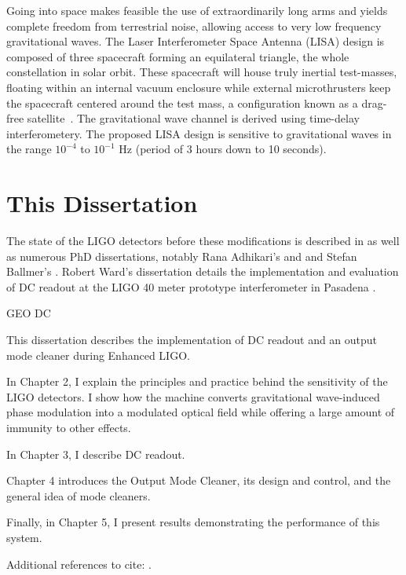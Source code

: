 Going into space makes feasible the use of extraordinarily long arms
and yields complete freedom from terrestrial noise, allowing access to
very low frequency gravitational waves.  The Laser Interferometer
Space Antenna (LISA) design is composed of three spacecraft forming an
equilateral triangle, the whole constellation in solar orbit.  These
spacecraft will house truly inertial test-masses, floating within an
internal vacuum enclosure while external microthrusters keep the
spacecraft centered around the test mass, a configuration known as a drag-free satellite~\cite{Lange1964DragFree}.  The gravitational wave
channel is derived using time-delay interferometery.  The proposed
LISA design is sensitive to gravitational waves in the range $10^{-4}$
to $10^{-1}$ Hz (period of 3 hours down to 10 seconds).

\section{This Dissertation}

The state of the LIGO detectors before these modifications is
described in \cite{S5InstrumentPaper} as well as numerous PhD
dissertations, notably Rana Adhikari's \cite{RanaThesis} and and
Stefan Ballmer's \cite{Ballmer2006LIGO}.  Robert Ward's dissertation
details the implementation and evaluation of DC readout at the LIGO 40
meter prototype interferometer in Pasadena \cite{RobWardThesis}.

GEO DC\cite{GeoDC,Degallaix2010Commissioning}


This dissertation describes the implementation of DC readout and an
output mode cleaner during Enhanced LIGO.



In Chapter 2, I explain the principles and practice behind the
sensitivity of the LIGO detectors.  I show how the machine converts
gravitational wave-induced phase modulation into a modulated optical
field while offering a large amount of immunity to other effects.

In Chapter 3, I describe DC readout.

Chapter 4 introduces the Output Mode Cleaner, its design and control,
and the general idea of mode cleaners.

Finally, in Chapter 5, I present results demonstrating the performance
of this system.

Additional references to cite: \cite{Garfinkle2005Gauge, Heinzel1999Advanced,Saulson1994Fundamentals, Harris1996Gravitational,Melissinos2010Response}.
